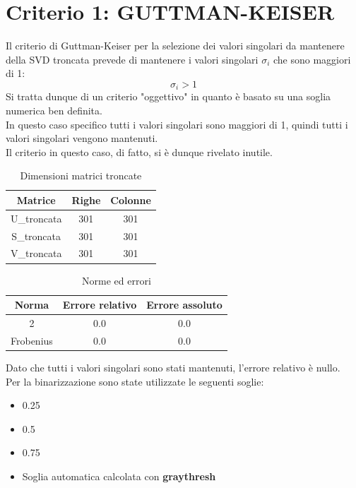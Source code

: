 \section{Criterio 1: GUTTMAN-KEISER}

Il criterio di Guttman-Keiser per la selezione dei valori singolari da mantenere della SVD troncata prevede di mantenere i valori singolari $\sigma_i$ che sono maggiori di 1:
\begin{equation}
    \sigma_i > 1
\end{equation}
Si tratta dunque di un criterio "oggettivo" in quanto è basato su una soglia numerica ben definita.\\
In questo caso specifico tutti i valori singolari sono maggiori di 1, quindi tutti i valori singolari vengono mantenuti.\\
Il criterio in questo caso, di fatto, si è dunque rivelato inutile.


\begin{table}[H]
    \centering
    \begin{tabular}{|c|c|c|}
        \hline
        \textbf{Matrice} & \textbf{Righe} & \textbf{Colonne} \\
        \hline
        U\_troncata & 301 & 301 \\
        \hline
        S\_troncata & 301 & 301 \\
        \hline
        V\_troncata & 301 & 301 \\
        \hline
    \end{tabular}
    \caption{Dimensioni matrici troncate}
\end{table}

\begin{table}[H]
    \centering
    \begin{tabular}{|c|c|c|}
        \hline
        \textbf{Norma} & \textbf{Errore relativo} & \textbf{Errore assoluto} \\
        \hline
        2 & 0.0 & 0.0 \\
        \hline
        Frobenius & 0.0 & 0.0 \\
        \hline
    \end{tabular}
    \caption{Norme ed errori}
\end{table}

\noindent Dato che tutti i valori singolari sono stati mantenuti, l'errore relativo è nullo.\\
Per la binarizzazione sono state utilizzate le seguenti soglie:
\begin{itemize}
    \item 0.25
    \item 0.5
    \item 0.75
    \item Soglia automatica calcolata con \textbf{graythresh}
\end{itemize}

